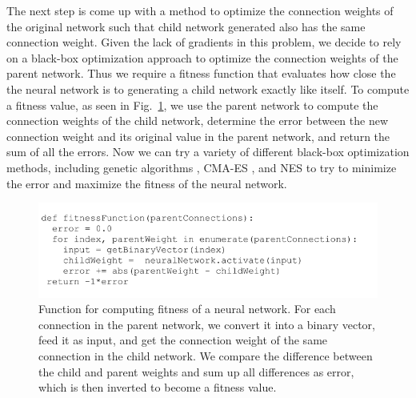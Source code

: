 \documentclass[12pt]{article}
\begin{document}
The next step is come up with a method to optimize the connection weights of the original network such that child network generated also has the same connection weight. Given the lack of gradients in this problem, we decide to rely on a black-box optimization approach to optimize the connection weights of the parent network. Thus we require a fitness function that evaluates how close the the neural network is to generating a child network exactly like itself. To compute a fitness value, as seen in Fig.~\ref{pseudo}, we use the parent network to compute the connection weights of the child network, determine the error between the new connection weight and its original value in the parent network, and return the sum of all the errors. Now we can try a variety of different black-box optimization methods, including genetic algorithms \cite{deb2002fast}, CMA-ES \cite{hansen2003reducing}, and NES \cite{wierstra2008natural} to try to minimize the error and maximize the fitness of the neural network.

\begin{figure}[h]
\begin{center}
  \includegraphics[width=0.8\linewidth]{pseudo.png}
\end{center}
   \caption{Function for computing fitness of a neural network. For each connection in the parent network, we convert it into a binary vector, feed it as input, and get the connection weight of the same connection in the child network. We compare the difference between the child and parent weights and sum up all differences as error, which is then inverted to become a fitness value.}
\label{pseudo}
\end{figure} 



\end{document}
